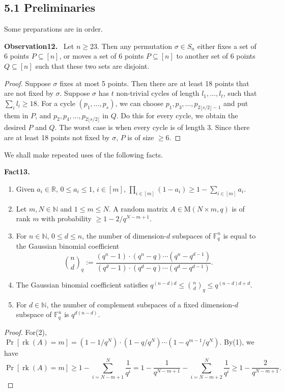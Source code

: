 \documentclass[10pt,a4paper]{article}
\newenvironment{authorclaim}[1]{\par\medskip\noindent\textbf{#1.}\ }{\par\medskip}
\begin{document}
\subsection*{5.1 Preliminaries}
Some preparations are in order.
\begin{authorclaim}{Observation12}
Let $n\ge23$. Then any permutation $\sigma\in S_n$ either fixes a set of 6 points $P\subseteq[n]$, or moves a set of 6 points $P\subseteq[n]$ to another set of 6 points $Q\subseteq[n]$ such that these two sets are disjoint.
\end{authorclaim}
\begin{proof}
Suppose $\sigma$ fixes at most 5 points. Then there are at least 18 points that are not fixed by $\sigma$. Suppose $\sigma$ has $t$ non-trivial cycles of length $l_1,\ldots,l_t$, such that $\sum_i l_i\ge18$. For a cycle $(p_1,\ldots,p_s)$, we can choose $p_1,p_3,\ldots,p_{2\lfloor s/2\rfloor-1}$ and put them in $P$, and $p_2,p_4,\ldots,p_{2\lfloor s/2\rfloor}$ in $Q$. Do this for every cycle, we obtain the desired $P$ and $Q$. The worst case is when every cycle is of length 3. Since there are at least 18 points not fixed by $\sigma$, $P$ is of size $\ge6$.
\end{proof}
We shall make repeated uses of the following facts.
\begin{authorclaim}{Fact13}
\begin{enumerate}
\item Given $a_i\in\mathbb R$, $0\le a_i\le1$, $i\in[m]$, $\prod_{i\in[m]}(1-a_i)\ge1-\sum_{i\in[m]}a_i$.
\item Let $m,N\in\mathbb N$ and $1\le m\le N$. A random matrix $A\in\mathrm M(N\times m,q)$ is of rank $m$ with probability $\ge1-2/q^{N-m+1}$.
\item For $n\in\mathbb N$, $0\le d\le n$, the number of dimension-$d$ subspaces of $\mathbb F_q^n$ is equal to the Gaussian binomial coefficient
\[\binom nd_q:=\frac{(q^n-1)\cdot(q^n-q)\cdots(q^n-q^{d-1})}{(q^d-1)\cdot(q^d-q)\cdots(q^d-q^{d-1})}.\]
\item The Gaussian binomial coefficient satisfies $q^{(n-d)d}\le\binom nd_q\le q^{(n-d)d+d}$.
\item For $d\in\mathbb N$, the number of complement subspaces of a fixed dimension-$d$ subspace of $\mathbb F_q^n$ is $q^{d(n-d)}$.
\end{enumerate}
\end{authorclaim}
\begin{proof}
For(2), $\Pr[\operatorname{rk}(A)=m]=(1-1/q^N)\cdot(1-q/q^N)\cdots(1-q^{m-1}/q^N)$. By(1), we have
\[\Pr[\operatorname{rk}(A)=m]\ge1-\sum_{i=N-m+1}^N\frac1{q^i}=1-\frac1{q^{N-m+1}}-\sum_{i=N-m+2}^N\frac1{q^i}\ge1-\frac2{q^{N-m+1}}.\]
\end{proof}
\end{document}
